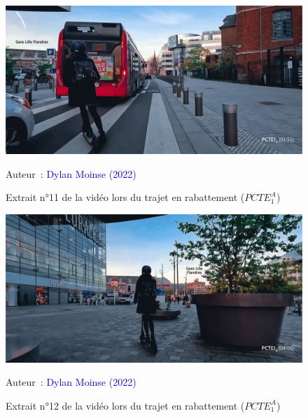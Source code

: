     \begin{figure}[h!]\vspace*{4pt}
        \caption*{Extrait n°11 de la vidéo lors du trajet en rabattement (\(PCTE^{A}_{1}\))}
        \centerline{\includegraphics[width=0.75\columnwidth]{src/Figures/Annexes/Extrait_Video_PCTE1_Access_11.jpg}}
        \vspace{5pt}
        \begin{flushright}\scriptsize{
        Auteur~: \textcolor{blue}{Dylan Moinse (2022)}
        }\end{flushright}
    \end{figure}

    \begin{figure}[h!]\vspace*{4pt}
        \caption*{Extrait n°12 de la vidéo lors du trajet en rabattement (\(PCTE^{A}_{1}\))}
        \centerline{\includegraphics[width=0.75\columnwidth]{src/Figures/Annexes/Extrait_Video_PCTE1_Access_12.jpg}}
        \vspace{5pt}
        \begin{flushright}\scriptsize{
        Auteur~: \textcolor{blue}{Dylan Moinse (2022)}
        }\end{flushright}
    \end{figure}

